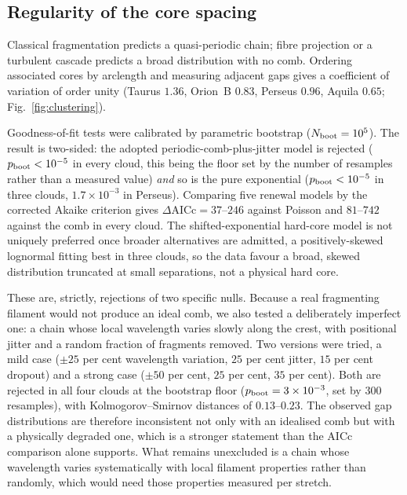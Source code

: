 \documentclass[usenatbib,twoside,twocolumn]{mnras}
\begin{document}
\subsection{Regularity of the core spacing}
\label{sec:clustering}

Classical fragmentation predicts a quasi-periodic chain; fibre projection or a turbulent cascade predicts a broad distribution with no comb. Ordering associated cores by arclength and measuring adjacent gaps gives a coefficient of variation of order unity (Taurus $1.36$, Orion~B $0.83$, Perseus $0.96$, Aquila $0.65$; Fig.~\ref{fig:clustering}).

Goodness-of-fit tests were calibrated by parametric bootstrap ($N_{\rm boot}=10^5$). The result is two-sided: the adopted periodic-comb-plus-jitter model is rejected ($p_{\rm boot}<10^{-5}$ in every cloud, this being the floor set by the number of resamples rather than a measured value) \emph{and} so is the pure exponential ($p_{\rm boot}<10^{-5}$ in three clouds, $1.7\times10^{-3}$ in Perseus). Comparing five renewal models by the corrected Akaike criterion gives $\Delta$AICc$=37$--$246$ against Poisson and $81$--$742$ against the comb in every cloud. The shifted-exponential hard-core model is not uniquely preferred once broader alternatives are admitted, a positively-skewed lognormal fitting best in three clouds, so the data favour a broad, skewed distribution truncated at small separations, not a physical hard core.

These are, strictly, rejections of two specific nulls. Because a real fragmenting filament would not produce an ideal comb, we also tested a deliberately imperfect one: a chain whose local wavelength varies slowly along the crest, with positional jitter and a random fraction of fragments removed. Two versions were tried, a mild case ($\pm25$ per cent wavelength variation, $25$ per cent jitter, $15$ per cent dropout) and a strong case ($\pm50$ per cent, $25$ per cent, $35$ per cent). Both are rejected in all four clouds at the bootstrap floor ($p_{\rm boot}=3\times10^{-3}$, set by $300$ resamples), with Kolmogorov--Smirnov distances of $0.13$--$0.23$. The observed gap distributions are therefore inconsistent not only with an idealised comb but with a physically degraded one, which is a stronger statement than the AICc comparison alone supports. What remains unexcluded is a chain whose wavelength varies systematically with local filament properties rather than randomly, which would need those properties measured per stretch.
\end{document}

